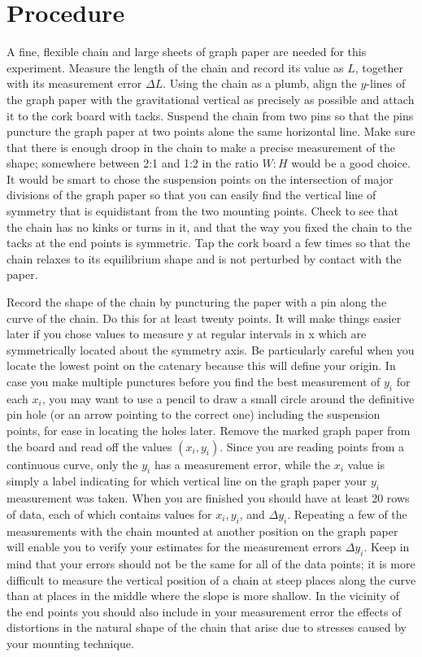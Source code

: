 \documentclass{revtex4}
\begin{document}
\section{Procedure}

A fine, flexible chain and large sheets of graph paper are needed for this
experiment. Measure the length of the chain and record its value as $L$,
together with its measurement error $\Delta L$. Using the chain as a plumb,
align the $y$-lines of the graph paper with the gravitational vertical as
precisely as possible and attach it to the cork board with tacks.
Suspend the chain from two pins so that the pins puncture the graph paper
at two points alone the same horizontal line. Make sure that there is enough
droop in the chain to make a precise measurement of the shape; somewhere
between 2:1 and 1:2 in the ratio $W:H$ would be a good choice. It would be
smart to chose the suspension points on the intersection of major divisions
of the graph paper so that you can easily find the vertical line of symmetry
that is equidistant from the two mounting points. Check to see that the
chain has no kinks or turns in it, and that the way you fixed the chain
to the tacks at the end points is symmetric. Tap the cork board a few times
so that the chain relaxes to its equilibrium shape and is not perturbed
by contact with the paper.

Record the shape of the chain by puncturing the paper with a pin along the
curve of the chain. Do this for at least twenty points. It will make things
easier later if you chose values to measure y at regular intervals in x which
are symmetrically located about the symmetry axis. Be particularly careful
when you locate the lowest point on the catenary because this will define
your origin. In case you make multiple punctures before you find the best
measurement of $y_i$ for each $x_i$, you may want to use a pencil to draw
a small circle around the definitive pin hole (or an arrow pointing to the
correct one) including the suspension points, for ease in locating the holes
later. Remove the marked graph paper from the board and read off the values
$(x_i,y_i)$. Since you are reading points from a continuous
curve, only the $y_i$ has a measurement error, while the $x_i$ value is
simply a label indicating for which vertical line on the graph paper your
$y_i$ measurement was taken. When you are finished you should have at least
20 rows of data, each of which contains values for $x_i,y_i$, and 
$\Delta y_i$. Repeating a few of the measurements with the chain mounted at
another position on the graph paper will enable you to verify your
estimates for the measurement errors $\Delta y_i$.  Keep in mind that your
errors should not be the same for all of the data points; it is more 
difficult to measure the vertical position of a chain at steep places along
the curve than at places in the middle where the slope is more shallow. In the
vicinity of the end points you should also include in your measurement error
the effects of distortions in the natural shape of the chain that arise due
to stresses caused by your mounting technique.
\end{document}
